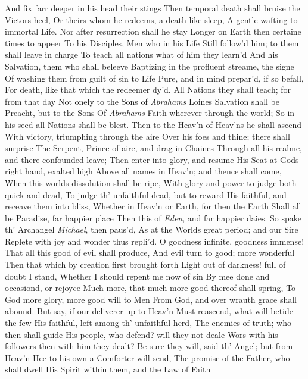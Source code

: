 \documentclass[11pt]{book}
\newcounter {first}
\begin{document}
And fix farr deeper in his head their stings 
Then temporal death shall bruise the Victors heel, 
Or theirs whom he redeems, a death like sleep, 
A gentle wafting to immortal Life. 
Nor after resurrection shall he stay 
Longer on Earth then certaine times to appeer 
To his Disciples, Men who in his Life 
Still follow'd him; to them shall leave in charge 
To teach all nations what of him they learn'd 
And his Salvation, them who shall beleeve 
Baptizing in the profluent streame, the signe 
Of washing them from guilt of sin to Life 
Pure, and in mind prepar'd, if so befall, 
For death, like that which the redeemer dy'd. 
All Nations they shall teach; for from that day 
Not onely to the Sons of \textit{Abrahams} Loines 
Salvation shall be Preacht, but to the Sons 
Of \textit{Abrahams} Faith wherever through the world; 
So in his seed all Nations shall be blest. 
Then to the Heav'n of Heav'ns he shall ascend 
With victory, triumphing through the aire 
Over his foes and thine; there shall surprise 
The Serpent, Prince of aire, and drag in Chaines 
Through all his realme, and there confounded leave; 
Then enter into glory, and resume 
His Seat at Gods right hand, exalted high 
Above all names in Heav'n; and thence shall come, 
When this worlds dissolution shall be ripe, 
With glory and power to judge both quick and dead, 
To judge th' unfaithful dead, but to reward 
His faithful, and receave them into bliss, 
Whether in Heav'n or Earth, for then the Earth 
Shall all be Paradise, far happier place 
Then this of \textit{Eden}, and far happier daies. 
\quad So spake th' Archangel \textit{Michael}, then paus'd, 
As at the Worlds great period; and our Sire 
Replete with joy and wonder thus repli'd. 
\quad O goodness infinite, goodness immense! 
That all this good of evil shall produce, 
And evil turn to good; more wonderful 
Then that which by creation first brought forth 
Light out of darkness! full of doubt I stand, 
Whether I should repent me now of sin 
By mee done and occasiond, or rejoyce 
Much more, that much more good thereof shall spring, 
To God more glory, more good will to Men 
From God, and over wrauth grace shall abound. 
But say, if our deliverer up to Heav'n 
Must reascend, what will betide the few 
His faithful, left among th' unfaithful herd, 
The enemies of truth; who then shall guide 
His people, who defend? will they not deale 
Wors with his followers then with him they dealt? 
\quad Be sure they will, said th' Angel; but from Heav'n 
Hee to his own a Comforter will send, 
The promise of the Father, who shall dwell 
His Spirit within them, and the Law of Faith 
\end{document}
